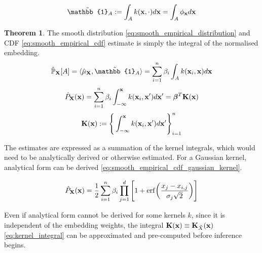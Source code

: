 \documentclass[twoside]{article} \usepackage{aistats2017}
\theoremstyle{definition}
\theoremstyle{theorem}
\newtheorem{theorem}{Theorem}[section]
\newcommand{\rv}[1]{{#1}}
\newcommand{\ds}[1]{\tilde{#1}}
\newcommand{\inner}[2]{{\langle #1, #2 \rangle}}
\begin{document}
		\begin{equation}
			\tilde{\mathbb{1}}_{A} := \int_{A} k(\bvec{x}, \cdot) d\bvec{x} = \int_{A} \phi_{\bvec{x}} d\bvec{x}
		\label{eq:indicator_smooth}
		\end{equation}
		
		\begin{theorem} \label{thm:smooth_empirical_distribution_and_cdf}
			The smooth distribution \eqref{eq:smooth_empirical_distribution} and CDF \eqref{eq:smooth_empirical_cdf} estimate is simply the integral of the normalised embedding.
			\begin{equation}
				\hat{\mathbb{P}}_{\bvec{\rv{X}}}[A] = \inner{\hat{\mu}_{\bvec{\rv{X}}}}{\tilde{\mathbb{1}}_{A}} = \sum_{i = 1}^{n} \beta_{i} \int_{A}  k(\bvec{x}_{i}, \bvec{x}) d\bvec{x}
			\label{eq:smooth_empirical_distribution}
			\end{equation}	
			\begin{equation}
				\hat{P}_{\bvec{\rv{X}}}(\bvec{x}) = \sum_{i = 1}^{n} \beta_{i} \int_{-\bvec{\infty}}^{\bvec{x}}  k(\bvec{x}_{i}, \bvec{x}') d\bvec{x}' = \bm{\beta}^{T} \bvec{K}(\bvec{x})
			\label{eq:smooth_empirical_cdf}
			\end{equation}
			\begin{equation}
				\mathbf{K}(\mathbf{x}) := \Bigg\{ \int_{-\mathbf{\infty}}^{\mathbf{x}}  k(\mathbf{x}_{i}, \mathbf{x}') d\mathbf{x}' \Bigg\}_{i = 1}^{n}
			\label{eq:kernel_integral}
			\end{equation}
		\end{theorem}

		The estimates are expressed as a summation of the kernel integrals, which would need to be analytically derived or otherwise estimated. For a Gaussian kernel, analytical form can be derived \eqref{eq:smooth_empirical_cdf_gaussian_kernel}.

		\begin{equation}
			\hat{P}_{\bvec{\rv{X}}}(\bvec{x}) = \frac{1}{2} \sum_{i = 1}^{n} \beta_{i} \prod_{j = 1}^{d} \Bigg[1 + \mathrm{erf}\bigg(\frac{x_{j} - x_{i, j}}{\sigma_{j} \sqrt{2}}\bigg)\Bigg]
		\label{eq:smooth_empirical_cdf_gaussian_kernel}
		\end{equation}

		Even if analytical form cannot be derived for some kernels $k$, since it is independent of the embedding weights, the integral $\bvec{K}(\bvec{x}) \equiv \bvec{K}_{\ds{X}}(\bvec{x})$ \eqref{eq:kernel_integral} can be approximated and pre-computed before inference begins.
\end{document}
